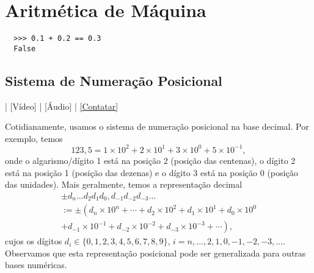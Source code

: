 
\chapter{Aritmética de Máquina}\label{cap_aritm}
\thispagestyle{fancy}

\ifispython
\begin{lstlisting}
  >>> 0.1 + 0.2 == 0.3
  False
\end{lstlisting}
\fi

\section{Sistema de Numeração Posicional}\label{cap_aritm_sec_sisnumpos}

\begin{flushright}
  [YouTube] | [Vídeo] | [Áudio] | \href{https://phkonzen.github.io/notas/contato.html}{[Contatar]}
\end{flushright}

Cotidianamente, usamos o sistema de numeração posicional na base decimal. Por exemplo, temos
\begin{equation}
  123,5 = 1\times 10^2 + 2\times 10^1 + 3\times 10^0 + 5\times 10^{-1},
\end{equation}
onde o algarismo/dígito 1 está na posição 2 (posição das centenas), o dígito 2 está na posição 1 (posição das dezenas) e o dígito 3 está na posição 0 (posição das unidades). Mais geralmente, temos a representação decimal
\begin{gather}
  \pm d_n\ldots d_2d_1d_0,d_{-1}d_{-2}d_{-3}\ldots \\
  := \pm \left(d_n\times 10^n + \cdots + d_2\times 10^2 + d_1\times 10^1 + d_0\times 10^0\right. \\
      \left. + d_{-1}\times 10^{-1} + d_{-2}\times 10^{-2} + d_{-3}\times 10^{-3} + \cdots\right),
\end{gather}
cujos os dígitos $d_i \in \{0, 1, 2, 3, 4, 5, 6, 7, 8, 9\}$, $i=n, \dotsc, 2, 1, 0, -1, -2, -3, \ldots$. Observamos que esta representação posicional pode ser generalizada para outras bases numéricas.


